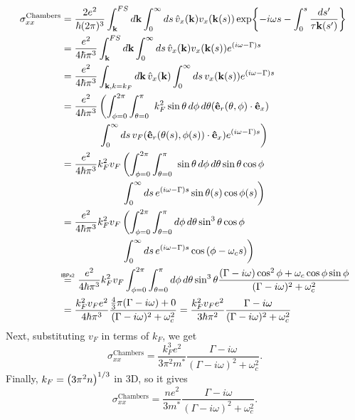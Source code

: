 \begin{align}
	\sigma_{xx}^{\text{Chambers}} &= \frac{2e^2}{\hbar(2\pi)^3}\displaystyle\int_{\vb{k}}^{FS}\mathop{d\vb{k}}\int_0^{\infty}\mathop{ds}
		\hat{v}_x(\vb{k})v_x(\vb{k}(s))
		\exp{-i\omega s - \int_0^s \frac{\mathop{ds'}}{\tau \vb{k}(s')}} \\
	&= \frac{e^2}{4\hbar\pi^3}\displaystyle\int_{\vb{k}}^{FS}\mathop{d\vb{k}}\int_0^{\infty}\mathop{ds}
	\hat{v}_x(\vb{k})v_x(\vb{k}(s))
		e^{(i\omega - \Gamma)s} \\
	&= \frac{e^2}{4\hbar\pi^3}\displaystyle\int_{\vb{k}, k = k_F}^{}\mathop{d\vb{k}} \hat{v}_x(\vb{k}) 
		\int_0^{\infty}\mathop{ds} v_x(\vb{k}(s)) e^{(i\omega - \Gamma)s} \\
	&= \begin{aligned}[t] \frac{e^2}{4\hbar\pi^3}&\left(\displaystyle\int_{\phi = 0}^{2\pi}\int_{\theta = 0}^{\pi}\ k_F^2\sin{\theta}\mathop{d\phi}\mathop{d\theta}(\vu{e}_r(\theta, \phi)\cdot \vu{e}_x)\right. \\
		&\left.\int_0^{\infty}\mathop{ds} v_F (\vu{e}_r(\theta(s), \phi(s))\cdot \vu{e}_x) e^{(i\omega - \Gamma)s}\right) \end{aligned} \\
	&= \begin{aligned}[t] \frac{e^2}{4\hbar\pi^3}k_F^2v_F&\left(\displaystyle\int_{\phi = 0}^{2\pi}\int_{\theta = 0}^{\pi}\ \sin{\theta}\mathop{d\phi}\mathop{d\theta} \sin{\theta}\cos{\phi} \right. \\
		&\left.\int_0^{\infty}\mathop{ds} e^{(i\omega - \Gamma)s} \sin{\theta(s)}\cos{\phi(s)}\right) \end{aligned} \\
	&= \begin{aligned}[t] \frac{e^2}{4\hbar\pi^3}k_F^2v_F&\left(\displaystyle\int_{\phi = 0}^{2\pi}\int_{\theta = 0}^{\pi} \mathop{d\phi}\mathop{d\theta} \sin^3{\theta}\cos{\phi} \right. \\
		&\left.\int_0^{\infty}\mathop{ds} e^{(i\omega - \Gamma)s} \cos{(\phi - \omega_c s)}\right) \end{aligned} \\
	&\myeq\ \frac{e^2}{4\hbar\pi^3}k_F^2v_F\displaystyle\int_{\phi = 0}^{2\pi}\int_{\theta = 0}^{\pi} \mathop{d\phi}\mathop{d\theta} \sin^3{\theta}\frac{(\Gamma - i\omega)\cos^2{\phi}+\omega_c\cos\phi\sin\phi}{(\Gamma - i\omega)^2 + \omega_c^2} \\
	&= \frac{k_F^2v_Fe^2}{4\hbar\pi^3}\frac{\frac{4}{3}\pi(\Gamma - i\omega) + 0}{(\Gamma - i\omega)^2 + \omega_c^2} = \frac{k_F^2v_Fe^2}{3\hbar\pi^2}\frac{\Gamma - i\omega}{(\Gamma - i\omega)^2 + \omega_c^2}
\end{align}
Next, substituting $v_F$ in terms of $k_F$, we get
\begin{equation}
	\sigma_{xx}^{\text{Chambers}} = \frac{k_F^3e^2}{3\pi^2m^*}\frac{\Gamma - i\omega}{(\Gamma - i\omega)^2 + \omega_c^2}.
\end{equation}
Finally, $k_F = \qty(3\pi^2n)^{1/3}$ in 3D, so it gives
\begin{equation}
    \sigma_{xx}^{\text{Chambers}} = \frac{n e^2}{3m^*}\frac{\Gamma - i\omega}{(\Gamma - i\omega)^2 + \omega_c^2}.
\end{equation}


